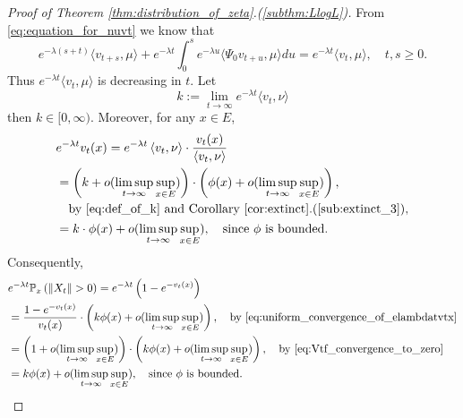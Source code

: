 \documentclass[12pt,a4paper]{amsart}
\numberwithin{equation}{section}
\theoremstyle{plain}
\theoremstyle{definition}
\begin{document}
\begin{proof}[Proof of Theorem \ref{thm:distribution_of_zeta}.(\ref{subthm:LlogL})]
    From \eqref{eq:equation_for_nuvt} we know that
  \begin{equation}\label{eq:ext_equ_int}
    e^{-\lambda(s+t)}\langle v_{t+s}, \mu\rangle + e^{-\lambda t}\int_0^s e^{-\lambda u}\langle \Psi_0v_{t+u},\mu\rangle du
=e^{-\lambda t}\langle v_t,\mu\rangle,
\quad t,s\geq 0. 
  \end{equation}
	Thus $e^{-\lambda t}\langle v_t, \mu\rangle$ is decreasing in $t$. 
  Let
\begin{equation}
\label{eq:def_of_k}
    k:=
    \lim_{t\to\infty}e^{-\lambda t}\langle v_t, \nu\rangle
\end{equation}
then $k\in[0,\infty)$. 
Moreover, for any $x\in E$,
\begin{align}
  &e^{-\lambda t} v_t(x) 
  = e^{-\lambda t} \left\langle v_t,\nu \right\rangle \cdot \frac{v_t(x)}{\left\langle v_t,\nu \right\rangle}
  \\& \begin{multlined}= \left(k + o(\limsup_{t\to \infty} \sup_{x\in E})\right) \cdot \left(\phi(x)+o(\limsup_{t\to \infty}\sup_{x\in E})\right),
\\\text{by \eqref{eq:def_of_k} and Corollary \ref{cor:extinct}.(\ref{sub:extinct_3})},
\end{multlined}
  \\&=k\cdot \phi(x) +o(\limsup_{t\to \infty}\sup_{x\in E}),
\quad\text{since $\phi$ is bounded.}
\label{eq:uniform_convergence_of_elambdatvtx}
\end{align}
	Consequently,
  \begin{align}
    &e^{-\lambda t}\mathbb P_x\left( \left\| X_t \right\| > 0 \right) 
    = e^{-\lambda t} \left( 1-e^{-v_t(x)} \right)
    \\&=\frac{1-e^{-v_t(x)}}{v_t(x)} \cdot \left( k\phi(x) + o(\limsup_{t\to \infty} \sup_{x\in E}) \right),\quad\text{by~\eqref{eq:uniform_convergence_of_elambdatvtx}}
    \\&= \left( 1+o(\limsup_{t\to \infty} \sup_{x\in E}) \right)\cdot \left( k\phi(x) + o(\limsup_{t\to \infty} \sup_{x\in E}) \right),\quad\text{by~\eqref{eq:Vtf_convergence_to_zero}}
    \\&= k\phi(x) + o(\limsup_{t\to \infty}\sup_{x\in E}),\quad\text{since $\phi$ is bounded.}  
\end{align}


\end{proof}
\end{document}
